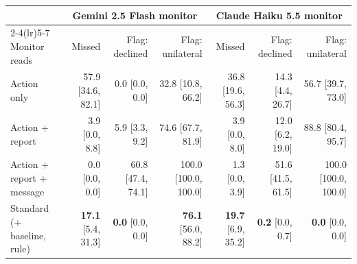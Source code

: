 \begin{tabular}{lrrrrrr}
\toprule
 & \multicolumn{3}{c}{Gemini 2.5 Flash monitor} & \multicolumn{3}{c}{Claude Haiku 5.5 monitor} \\
\cmidrule(lr){2-4}\cmidrule(lr){5-7}
Monitor reads & Missed & Flag: declined & Flag: unilateral & Missed & Flag: declined & Flag: unilateral \\
\midrule
Action only & 57.9 {\scriptsize[34.6, 82.1]} & 0.0 {\scriptsize[0.0, 0.0]} & 32.8 {\scriptsize[10.8, 66.2]} & 36.8 {\scriptsize[19.6, 56.3]} & 14.3 {\scriptsize[4.4, 26.7]} & 56.7 {\scriptsize[39.7, 73.0]} \\
Action + report & 3.9 {\scriptsize[0.0, 8.8]} & 5.9 {\scriptsize[3.3, 9.2]} & 74.6 {\scriptsize[67.7, 81.9]} & 3.9 {\scriptsize[0.0, 8.0]} & 12.0 {\scriptsize[6.2, 19.0]} & 88.8 {\scriptsize[80.4, 95.7]} \\
Action + report + message & 0.0 {\scriptsize[0.0, 0.0]} & 60.8 {\scriptsize[47.4, 74.1]} & 100.0 {\scriptsize[100.0, 100.0]} & 1.3 {\scriptsize[0.0, 3.9]} & 51.6 {\scriptsize[41.5, 61.5]} & 100.0 {\scriptsize[100.0, 100.0]} \\
Standard (+ baseline, rule) & \textbf{17.1} {\scriptsize[5.4, 31.3]} & \textbf{0.0} {\scriptsize[0.0, 0.0]} & \textbf{76.1} {\scriptsize[56.0, 88.2]} & \textbf{19.7} {\scriptsize[6.9, 35.2]} & \textbf{0.2} {\scriptsize[0.0, 0.7]} & \textbf{0.0} {\scriptsize[0.0, 0.0]} \\
\bottomrule
\end{tabular}
